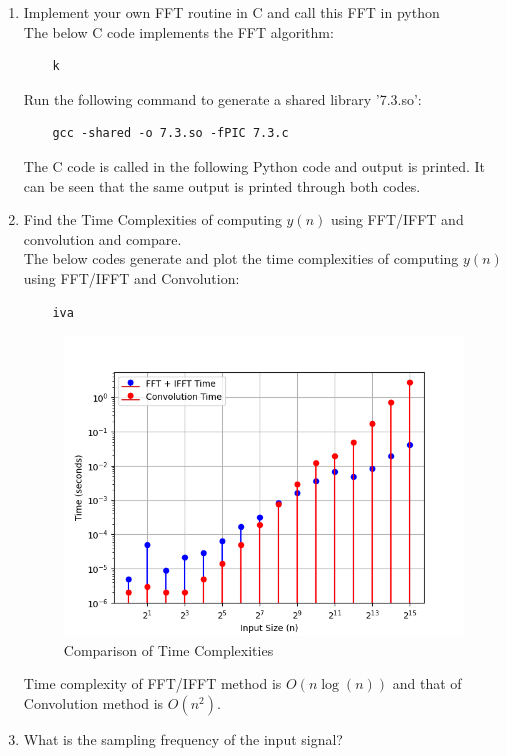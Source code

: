 \documentclass[journal,12pt,twocolumn]{IEEEtran}
\theoremstyle{remark}
\renewcommand\thesection{\arabic{section}}
\numberwithin{equation}{subsection}
\begin{document}
\begin{enumerate}[label=\thesection.\arabic*]
\item Implement your own FFT routine in C and call this FFT in python
\\
\solution The below C code implements the FFT algorithm:
\begin{lstlisting}
    k
\end{lstlisting}
Run the following command to generate a shared library '7.3.so':
\begin{lstlisting}
    gcc -shared -o 7.3.so -fPIC 7.3.c
\end{lstlisting}
The C code is called in the following Python code and output is printed. It can be seen that the same output is printed through both codes.
\\
\item Find the Time Complexities of computing $y(n)$ using FFT/IFFT and convolution and compare. 
\\
\solution The below codes generate and plot the time complexities of computing $y(n)$ using FFT/IFFT and Convolution:
\begin{lstlisting}
    iva
\end{lstlisting}
\begin{figure}[!h]
    \centering
    \includegraphics[width = \columnwidth]{figs/7.4.png}
    \caption{Comparison of Time Complexities}
    \label{fig:7.4}
\end{figure}
Time complexity of FFT/IFFT method is $O(n\log(n))$ and that of Convolution method is $O(n^2)$.
\\
\item What is the sampling frequency of the input signal?
\\

\end{enumerate}
\end{document}
